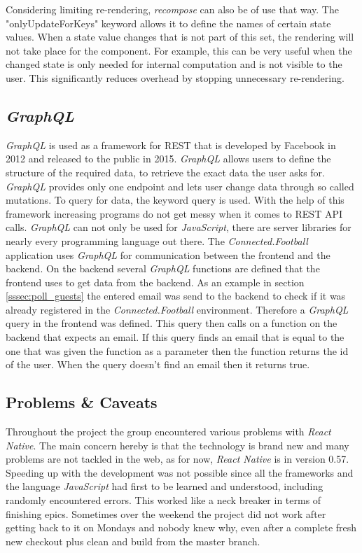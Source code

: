 \newline
Considering limiting re-rendering, \textit{recompose} can also be of use that way. The "onlyUpdateForKeys" keyword allows it to define the names of certain state values. When a state value changes that is not part of this set, the rendering will not take place for the component. For example, this can be very useful when the changed state is only needed for internal computation and is not visible to the user. This significantly reduces overhead by stopping unnecessary re-rendering.

\subsection{\textit{GraphQL}}
\label{ssec:graphql}

\textit{GraphQL} is used as a framework for REST that is developed by Facebook in 2012 and released to the public in 2015. \textit{GraphQL} allows users to define the structure of the required data, to retrieve the exact data the user asks for. \textit{GraphQL} provides only one endpoint and lets user change data through so called mutations. To query for data, the keyword query is used. With the help of this framework increasing programs do not get messy when it comes to REST API calls. \textit{GraphQL} can not only be used for \textit{JavaScript}, there are server libraries for nearly every programming language out there.
\newline
The \textit{Connected.Football} application uses \textit{GraphQL} for communication between the frontend and the backend. On the backend several \textit{GraphQL} functions are defined that the frontend uses to get data from the backend. As an example in section \ref{sssec:poll_guests} the entered email was send to the backend to check if it was already registered in the \textit{Connected.Football} environment. Therefore a \textit{GraphQL} query in the frontend was defined. This query then calls on a function on the backend that expects an email. If this query finds an email that is equal to the one that was given the function as a parameter then the function returns the id of the user. When the query doesn't find an email then it returns true. 


\subsection{Problems \& Caveats}
\label{ssec:problems}

Throughout the project the group encountered various problems with \textit{React Native}. The main concern hereby is that the technology is brand new and many problems are not tackled in the web, as for now, \textit{React Native} is in version 0.57. Speeding up with the development was not possible since all the frameworks and the language \textit{JavaScript} had first to be learned and understood, including randomly encountered errors. This worked like a neck breaker in terms of finishing epics. Sometimes over the weekend the project did not work after getting back to it on Mondays and nobody knew why, even after a complete fresh new checkout plus clean and build from the master branch.

